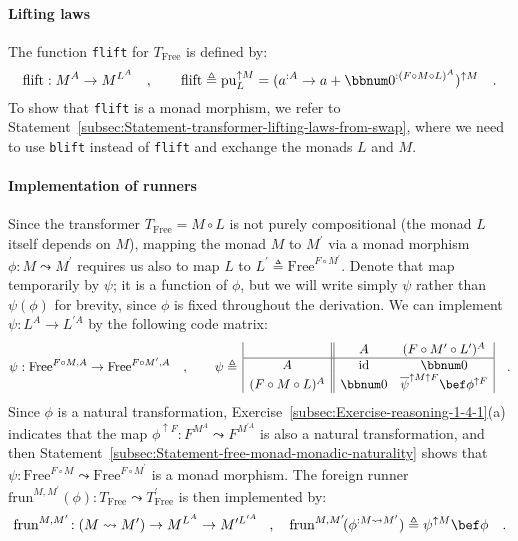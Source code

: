 \paragraph{Lifting laws}

The function \lstinline!flift! for $T_{\text{Free}}$ is defined
by:
\[
\text{flift}:M^{A}\rightarrow M^{L^{A}}\quad,\quad\quad\text{flift}\triangleq\text{pu}_{L}^{\uparrow M}=(a^{:A}\rightarrow a+\bbnum 0^{:(F\circ M\circ L)^{A}})^{\uparrow M}\quad.
\]
To show that \lstinline!flift! is a monad morphism, we refer to Statement~\ref{subsec:Statement-transformer-lifting-laws-from-swap},
where we need to use \lstinline!blift! instead of \lstinline!flift!
and exchange the monads $L$ and $M$.

\paragraph{Implementation of runners}

Since the transformer $T_{\text{Free}}=M\circ L$ is not purely compositional
(the monad $L$ itself depends on $M$), mapping the monad $M$ to
$M^{\prime}$ via a monad morphism $\phi:M\leadsto M^{\prime}$ requires
us also to map $L$ to $L^{\prime}\triangleq\text{Free}^{F\circ M^{\prime}}$.
Denote that map temporarily by $\psi$; it is a function of $\phi$,
but we will write simply $\psi$ rather than $\psi(\phi)$ for brevity,
since $\phi$ is fixed throughout the derivation. We can implement
$\psi:L^{A}\rightarrow L^{\prime A}$ by the following code matrix:
\begin{equation}
\psi:\text{Free}^{F\circ M,A}\rightarrow\text{Free}^{F\circ M^{\prime},A}\quad,\quad\quad\psi\triangleq\,\begin{array}{|c||cc|}
 & A & (F\circ M^{\prime}\circ L^{\prime})^{A}\\
\hline A & \text{id} & \bbnum 0\\
(F\circ M\circ L)^{A} & \bbnum 0 & \overline{\psi}^{\uparrow M\uparrow F}\bef\phi^{\uparrow F}
\end{array}\quad.\label{eq:free-monad-definition-of-psi}
\end{equation}
Since $\phi$ is a natural transformation, Exercise~\ref{subsec:Exercise-reasoning-1-4-1}(a)
indicates that the map $\phi^{\uparrow F}:F^{M^{A}}\leadsto F^{M^{\prime A}}$
is also a natural transformation, and then Statement~\ref{subsec:Statement-free-monad-monadic-naturality}
shows that $\psi:\text{Free}^{F\circ M}\leadsto\text{Free}^{F\circ M^{\prime}}$
is a monad morphism. The foreign runner $\text{frun}^{M,M^{\prime}}(\phi):T_{\text{Free}}\leadsto T_{\text{Free}}^{\prime}$
is then implemented by:
\[
\text{frun}^{M,M^{\prime}}\!:\left(M\leadsto M^{\prime}\right)\rightarrow M^{L^{A}}\rightarrow M^{\prime L^{\prime A}}\!\quad,\quad\text{frun}^{M,M^{\prime}}\!(\phi^{:M\leadsto M^{\prime}})\triangleq\psi^{\uparrow M}\bef\phi\quad.
\]

